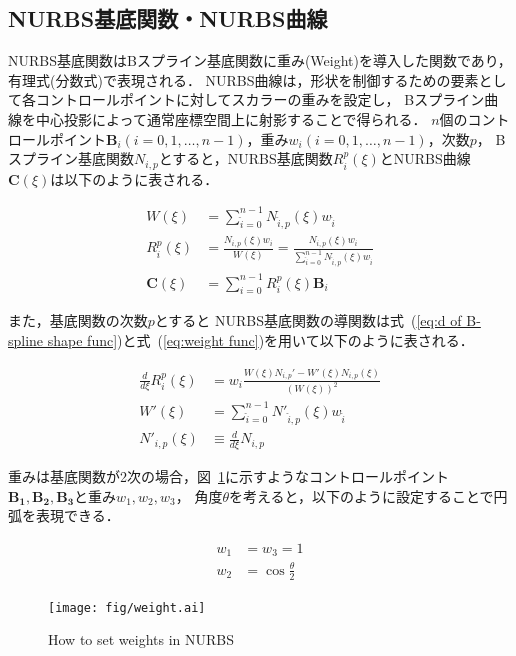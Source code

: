 \newpage

\subsection{NURBS基底関数・NURBS曲線}
NURBS基底関数はBスプライン基底関数に重み(Weight)を導入した関数であり，有理式(分数式)で表現される．
NURBS曲線は，形状を制御するための要素として各コントロールポイントに対してスカラーの重みを設定し，
Bスプライン曲線を中心投影によって通常座標空間上に射影することで得られる．
$n$個のコントロールポイント$\boldsymbol{B}_i(i = 0, 1, \dots, n-1)$，重み$w_i(i = 0, 1, \dots, n-1)$，次数$p$，
Bスプライン基底関数$N_{i,p}$とすると，NURBS基底関数$R^p_i(\xi)$とNURBS曲線$\boldsymbol{C}(\xi)$は以下のように表される．

\begin{align}
  \label{eq:weight func}
  W(\xi) &= \sum_{\hat{i}=0}^{n-1}N_{\hat{i},p}(\xi)w_{\hat{i}}\\
  R^{p}_{i}(\xi)&=\frac{N_{i,p}(\xi)w_i}{W(\xi)}=\frac{N_{i,p}(\xi)w_i}{\sum_{\hat{i}=0}^{n-1}N_{\hat{i},p}(\xi)w_{\hat{i}}}\\
  \boldsymbol{C}(\xi)&=\sum_{i=0}^{n-1}R^{p}_{i}(\xi)\boldsymbol{B}_i
\end{align}

また，基底関数の次数$p$とすると
NURBS基底関数の導関数は式~(\ref{eq:d of B-spline shape func})と式~(\ref{eq:weight func})を用いて以下のように表される．

\begin{align}
  \label{eq:d of NURBS shape func}
  \frac{d}{d\xi} R^p_i (\xi) &= w_i \frac{W(\xi)N_{i,p}' - W'(\xi)N_{i,p}(\xi)}{(W(\xi))^2} \\
  W'(\xi) &= \sum^{n - 1}_{\hat{i} = 0} N'_{\hat{i},p}(\xi)w_{\hat{i}}\\
  N'_{i,p}(\xi) &\equiv \frac{d}{d\xi}N_{i,p}
\end{align}


重みは基底関数が2次の場合，図~\ref{fig:weight}に示すようなコントロールポイント
$\boldsymbol{B_1},\boldsymbol{B_2},\boldsymbol{B_3}$と重み$w_1,w_2,w_3$，
角度$\theta$を考えると，以下のように設定することで円弧を表現できる．

\begin{align}
  w_1 &= w_3 = 1\\
  w_2 &= \cos{\frac{\theta}{2}}
\end{align}

\begin{figure}[htbp]
  \centering
  \texttt{[image: fig/weight.ai]}
  \caption{How to set weights in NURBS}
  \label{fig:weight}
\end{figure}

